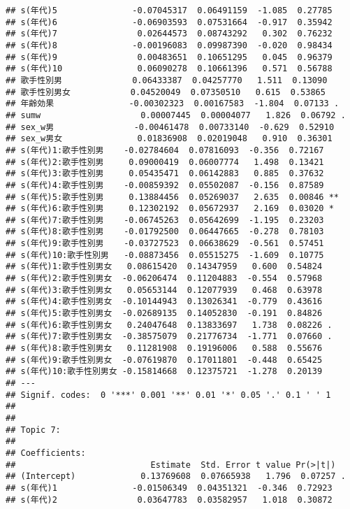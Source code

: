 \documentclass[
]{article}
\begin{document}
\begin{verbatim}
## s(年代)5               -0.07045317  0.06491159  -1.085  0.27785   
## s(年代)6               -0.06903593  0.07531664  -0.917  0.35942   
## s(年代)7                0.02644573  0.08743292   0.302  0.76232   
## s(年代)8               -0.00196083  0.09987390  -0.020  0.98434   
## s(年代)9                0.00483651  0.10651295   0.045  0.96379   
## s(年代)10               0.06090278  0.10661396   0.571  0.56788   
## 歌手性別男              0.06433387  0.04257770   1.511  0.13090   
## 歌手性別男女            0.04520049  0.07350510   0.615  0.53865   
## 年齢効果               -0.00302323  0.00167583  -1.804  0.07133 . 
## sumw                    0.00007445  0.00004077   1.826  0.06792 . 
## sex_w男                -0.00461478  0.00733140  -0.629  0.52910   
## sex_w男女               0.01836908  0.02019048   0.910  0.36301   
## s(年代)1:歌手性別男    -0.02784604  0.07816093  -0.356  0.72167   
## s(年代)2:歌手性別男     0.09000419  0.06007774   1.498  0.13421   
## s(年代)3:歌手性別男     0.05435471  0.06142883   0.885  0.37632   
## s(年代)4:歌手性別男    -0.00859392  0.05502087  -0.156  0.87589   
## s(年代)5:歌手性別男     0.13884456  0.05269037   2.635  0.00846 **
## s(年代)6:歌手性別男     0.12302192  0.05672937   2.169  0.03020 * 
## s(年代)7:歌手性別男    -0.06745263  0.05642699  -1.195  0.23203   
## s(年代)8:歌手性別男    -0.01792500  0.06447665  -0.278  0.78103   
## s(年代)9:歌手性別男    -0.03727523  0.06638629  -0.561  0.57451   
## s(年代)10:歌手性別男   -0.08873456  0.05515275  -1.609  0.10775   
## s(年代)1:歌手性別男女   0.08615420  0.14347959   0.600  0.54824   
## s(年代)2:歌手性別男女  -0.06206474  0.11204883  -0.554  0.57968   
## s(年代)3:歌手性別男女   0.05653144  0.12077939   0.468  0.63978   
## s(年代)4:歌手性別男女  -0.10144943  0.13026341  -0.779  0.43616   
## s(年代)5:歌手性別男女  -0.02689135  0.14052830  -0.191  0.84826   
## s(年代)6:歌手性別男女   0.24047648  0.13833697   1.738  0.08226 . 
## s(年代)7:歌手性別男女  -0.38575079  0.21776734  -1.771  0.07660 . 
## s(年代)8:歌手性別男女   0.11281908  0.19196006   0.588  0.55676   
## s(年代)9:歌手性別男女  -0.07619870  0.17011801  -0.448  0.65425   
## s(年代)10:歌手性別男女 -0.15814668  0.12375721  -1.278  0.20139   
## ---
## Signif. codes:  0 '***' 0.001 '**' 0.01 '*' 0.05 '.' 0.1 ' ' 1
## 
## 
## Topic 7:
## 
## Coefficients:
##                           Estimate  Std. Error t value Pr(>|t|)   
## (Intercept)             0.13769608  0.07665938   1.796  0.07257 . 
## s(年代)1               -0.01506349  0.04351321  -0.346  0.72923   
## s(年代)2                0.03647783  0.03582957   1.018  0.30872   

\end{verbatim}
\end{document}
